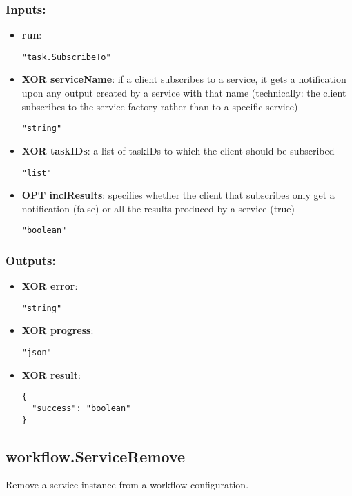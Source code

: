 \subsubsection*{Inputs:}
\begin{itemize}
    \item \textbf{run}: 
\begin{lstlisting}
"task.SubscribeTo"
\end{lstlisting}
    \item \textbf{XOR serviceName}: if a client subscribes to a service, it gets a notification upon any  output created by a service with that name (technically: the client  subscribes to the service factory rather than to a specific service)
\begin{lstlisting}
"string"
\end{lstlisting}
    \item \textbf{XOR taskIDs}: a list of taskIDs to which the client should be subscribed
\begin{lstlisting}
"list"
\end{lstlisting}
    \item \textbf{OPT inclResults}: specifies whether the client that subscribes only get a notification (false) or all the results produced by a service (true)
\begin{lstlisting}
"boolean"
\end{lstlisting}
  \end{itemize}

\subsubsection*{Outputs:}
\begin{itemize}
    \item \textbf{XOR error}: 
\begin{lstlisting}
"string"
\end{lstlisting}
    \item \textbf{XOR progress}: 
\begin{lstlisting}
"json"
\end{lstlisting}
    \item \textbf{XOR result}: 
\begin{lstlisting}
{
  "success": "boolean"
}
\end{lstlisting}
  \end{itemize}

\subsection{workflow.ServiceRemove}
Remove a service instance from a workflow configuration.
